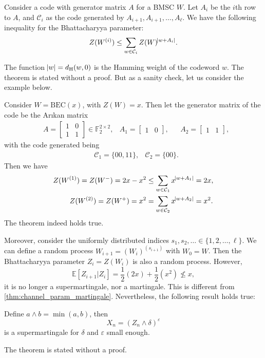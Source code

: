 \begin{theorem}
    Consider a code with generator matrix $A$ for a BMSC $W$. Let $A_i$ be the $i$th row to $A$, and $\mathcal{C}_i$ as the code generated by $A_{i+1},A_{i+1},\ldots,A_\ell$. We have the following inequality for the Bhattacharyya parameter:
    \begin{equation}
        Z(W^{(i)}) \le \sum_{w\in\mathcal{C}_i} Z(W)^{\abs{w+A_i}}.
    \end{equation}
\end{theorem}
The function $\abs{w}=d_\mathrm{H}(w,0)$ is the Hamming weight of the codeword $w$. The theorem is stated without a proof. But as a sanity check, let us consider the example below.
\begin{example}
    Consider $W=\mathrm{BEC}(x)$, with $Z(W) = x$. Then let the generator matrix of the code be the Ar{\i}kan matrix
    \begin{align*}
        &A = \left[\begin{matrix}
            1 & 0 \\ 1 & 1
        \end{matrix}\right]\in\mathbb{F}_2^{2\times2}, & A_1=[\begin{matrix}
            1 & 0
        \end{matrix}], &&A_2 = [\begin{matrix}
            1 & 1
        \end{matrix}],
    \end{align*}
    with the code generated being
    \begin{align*}
        &\mathcal{C}_1 = \{00,11\}, &\mathcal{C}_2 = \{00\}.
    \end{align*}
    Then we have
    \begin{align*}
        Z(W^{(1)}) = Z(W^-) = 2x-x^2 &\le \sum_{w\in\mathcal{C}_1} x^{\abs{w+A_1}} = 2x, \\
        Z(W^{(2)}) = Z(W^+) = x^2 &= \sum_{w\in\mathcal{C}_2} x^{\abs{w+A_2}} = x^2.
    \end{align*}
    The theorem indeed holds true.
\end{example}
Moreover, consider the uniformly distributed indices $s_1,s_2,\ldots\in\{1,2,\ldots,\ell\}$. We can define a random process $W_{i+1}=(W_i)^{(s_{i+1})}$ with $W_0 = W$. Then the Bhattacharyya parameter $Z_i=Z(W_i)$ is also a random process. However,
\begin{equation*}
    \mathbb{E}[Z_{i+1}\vert Z_i] = \frac{1}{2}(2x) + \frac{1}{2}(x^2) \not\le x,
\end{equation*}
it is no longer a supermartingale, nor a martingale. This is different from \autoref{thm:channel_param_martingale}. Nevertheless, the following result holds true:
\begin{theorem}
    Define $a\wedge b = \min(a,b)$, then
    \begin{equation}
        X_n = (Z_n\wedge\delta)^\varepsilon
    \end{equation}
    is a supermartingale for $\delta$ and $\varepsilon$ small enough.
\end{theorem}
The theorem is stated without a proof.



